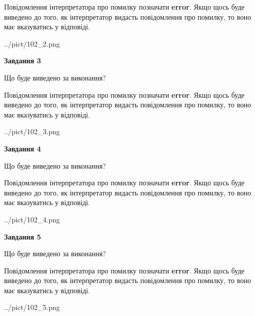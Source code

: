 \documentclass[12pt, ukrainian]{article}
\begin{document}
{\begin {large}
Повідомлення інтерпретатора про помилку позначати \textbf{error}.
Якщо щось буде виведено до того, як інтерпретатор видасть повідомлення про помилку, 
то воно має вказуватись у відповіді. \par


\begin{center}
	{../pict/102_2.png}
\end{center}
\newpage

{\begin {center}\textbf{Завдання 3}\end {center}}\par
Що буде виведено за виконання?

Повідомлення інтерпретатора про помилку позначати \textbf{error}.
Якщо щось буде виведено до того, як інтерпретатор видасть повідомлення про помилку, 
то воно має вказуватись у відповіді. \par


\begin{center}
	{../pict/102_3.png}
\end{center}
\newpage

{\begin {center}\textbf{Завдання 4}\end {center}}\par
Що буде виведено за виконання?

Повідомлення інтерпретатора про помилку позначати \textbf{error}.
Якщо щось буде виведено до того, як інтерпретатор видасть повідомлення про помилку, 
то воно має вказуватись у відповіді. \par


\begin{center}
	{../pict/102_4.png}
\end{center}
\newpage

{\begin {center}\textbf{Завдання 5}\end {center}}\par
Що буде виведено за виконання?

Повідомлення інтерпретатора про помилку позначати \textbf{error}.
Якщо щось буде виведено до того, як інтерпретатор видасть повідомлення про помилку, 
то воно має вказуватись у відповіді. \par


\begin{center}
	{../pict/102_5.png}
\end{center}
\newpage


\end{large}}
\end{document}
